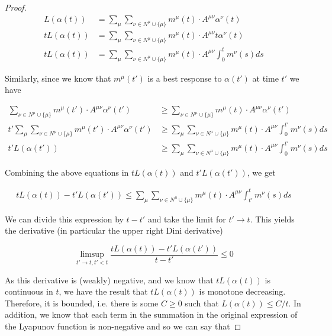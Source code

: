 \documentclass{article}
\theoremstyle{definition}
\begin{document}
\begin{proof}
    \begin{align}
      L(\alpha(t)) & = \sum_\mu \sum_{\nu \in N^\mu \cup \{\mu\}} m^\mu(t) \cdot A^{\mu \nu} \alpha^\nu(t) \\
      t L(\alpha(t)) & = \sum_\mu \sum_{\nu \in N^\mu \cup \{\mu\}} m^\mu(t) \cdot A^{\mu \nu} t \alpha^\nu(t) \\
      t L(\alpha(t)) & = \sum_\mu \sum_{\nu \in N^\mu \cup \{\mu\}} m^\mu(t) \cdot A^{\mu \nu} \int_0^t m^\nu(s) ds
    \end{align}

    Similarly, since we know that $m^\mu(t')$ is a best response to $\alpha(t')$ at time $t'$ we have

    \begin{align}
      \sum_{\nu \in N^\mu \cup \{\mu\}} m^\mu(t') \cdot A^{\mu \nu} \alpha^\nu(t') & \geq \sum_{\nu \in N^\mu \cup \{\mu\}} m^\mu(t) \cdot A^{\mu \nu} \alpha^\nu(t') \\
      t' \sum_\mu \sum_{\nu \in N^\mu \cup \{\mu\}} m^\mu(t') \cdot A^{\mu \nu} \alpha^\nu(t') & \geq \sum_\mu \sum_{\nu \in N^\mu \cup \{\mu\}} m^\mu(t) \cdot A^{\mu \nu} \int_0^{t'} m^\nu(s) ds \\
      t' L(\alpha(t')) & \geq \sum_\mu \sum_{\nu \in N^\mu \cup \{\mu\}} m^\mu(t) \cdot A^{\mu \nu} \int_0^{t'} m^\nu(s) ds 
    \end{align}

    Combining the above equations in $t L(\alpha(t))$ and $t' L(\alpha(t'))$, we get

    \begin{align}
      t L(\alpha(t)) - t' L(\alpha(t')) \leq \sum_\mu \sum_{\nu \in N^\mu \cup \{\mu\}} m^\mu(t) \cdot A^{\mu \nu} \int_{t'}^{t} m^\nu(s) ds 
    \end{align}

    We can divide this expression by $t - t'$ and take the limit for $t' \rightarrow t$. This yields the derivative (in particular the upper right Dini derivative)

    \begin{equation}
      \limsup_{t' \rightarrow t, t' < t}\frac{t L(\alpha(t)) - t' L(\alpha(t'))}{t - t'} \leq 0
    \end{equation}

    As this derivative is (weakly) negative, and we know that $tL(\alpha(t))$ is continuous in $t$, we have the result that $t L(\alpha(t))$ is monotone decreasing. Therefore, it is bounded, i.e. there is some $C \geq 0$ such that $L(\alpha(t)) \leq C/t$. In addition, we know that each term in the summation in the original expression of the Lyapunov function is non-negative and so we can say that


\end{proof}
\end{document}
